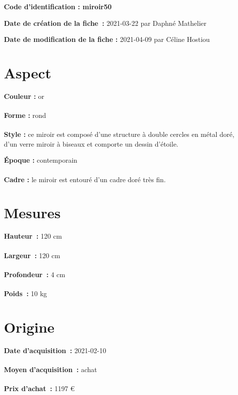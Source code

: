 
     {\bf \huge Code d’identification : miroir50} \\
    \newline \hr \begin{center} 
       
    \end{center} 
    \begin{itemize}
    
    \footnotesize {\item {\bf Date de création de la fiche :} 2021-03-22
    {par Daphné Mathelier}} 
    \footnotesize {\item {\bf Date de modification de la fiche :} 2021-04-09
    {par Céline Hostiou} \\}
    \end{itemize}
   \hr 
    \section* {Aspect} 
    {\bf \large Couleur :} or
    \\ \\ {\bf \large Forme :} rond 
    \\ \\ {\bf \large Style :} 
            ce miroir est composé d’une structure à double cercles en métal
                doré, d’un verre miroir à biseaux et comporte un dessin d’étoile.
        
        {\bf \large Époque :} contemporain 
    \\ \\ {\bf \large Cadre :} le miroir est entouré d’un cadre doré très fin. 
    \section* {Mesures}
     {\bf \large Hauteur :} 120 cm
   \\ \\ {\bf \large Largeur :} 120 cm 
   \\ \\ {\bf \large Profondeur :} 4 cm  
   \\ \\ {\bf \large Poids :} 10 kg
  
    \section* {Origine}
    {\bf \large Date d’acquisition :} 2021-02-10 \\ \\
    {\bf \large Moyen d’acquisition :} achat \\ \\
     {\bf \large Prix d’achat :}
        1197 € 
      
